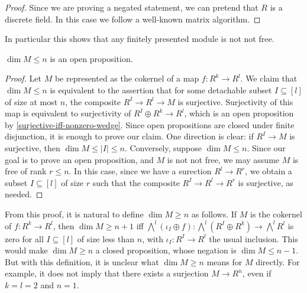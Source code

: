 \begin{proof}
Since we are proving a negated statement, we can pretend that $R$ is a discrete field.
In this case we follow a well-known matrix algorithm. %
\end{proof}
In particular this shows that any finitely presented module is not not free.
\begin{lemma}
$\dim M \le n$ is an open proposition.
\end{lemma}
\begin{proof}
Let $M$ be represented as the cokernel of a map $f : R^k \to R^l$.
We claim that $\dim M \le n$ is equivalent to the assertion that
for some detachable subset $I \subseteq [l]$ of size at most $n$,
the composite $R^I \to R^l \to M$ is surjective.
Surjectivity of this map is equivalent to surjectivity of
$R^I \oplus R^k \to R^l$, which is an
open proposition by \cref{surjective-iff-nonzero-wedge}.
Since open propositions are closed under finite disjunction, it is enough
to prove our claim.
One direction is clear: if $R^I \to M$ is surjective, then $\dim M \le |I| \le n$.
Conversely, suppose $\dim M \le n$. Since our goal is to prove an
open proposition, and $M$ is not not free, we may assume $M$ is free
of rank $r \le n$. In this case, since we have a surection $R^l \to R^r$, 
we obtain a subset $I \subseteq [l]$
of size $r$ such that the composite $R^I \to R^l \to R^r$ is surjective,
as needed.
\end{proof}

From this proof, it is natural to define $\dim M \ge n$ as follows.
If $M$ is the cokernel of $f : R^k \to R^l$, then $\dim M \ge n+1$
iff $\bigwedge^l (\iota_I \oplus f) : \bigwedge^l (R^I \oplus R^k) \to \bigwedge^l R^l$
is zero for all $I \subseteq [l]$ of size less than $n$, with $\iota_I : R^I \to R^l$
the usual inclusion. This would make $\dim M \ge n$ a closed proposition,
whose negation is $\dim M \le n-1$. But with this definition, it is unclear
what $\dim M \ge n$ means for $M$ directly. For example, it does not imply that
there exists a surjection $M \to R^n$, even if $k = l = 2$ and $n = 1$.
